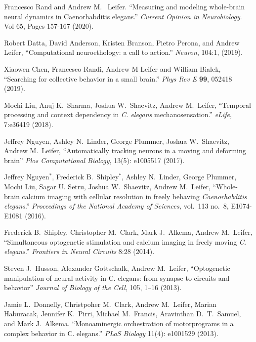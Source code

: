 \documentclass[11pt]{article}
\makeatletter
\newlength{\bibhang}
\newlength{\bibsep}
\newcounter{Lcount}
 {\@listi \global\bibsep\itemsep \global\advance\bibsep by\parsep}
\newenvironment{bibsection}%
        {\begin{list}{\arabic{Lcount}.}{%
       \usecounter{Lcount}%
       \setlength\labelwidth{-0.5em}%
       \setlength{\leftmargin}{\bibhang}%
       \setlength{\itemindent}{-\leftmargin}%
       \setlength{\itemsep}{\bibsep}%
       \setlength{\parsep}{\z@}%
        \setlength{\partopsep}{0pt}%
        \setlength{\topsep}{0pt}}}
        {\end{list}\vspace{-.6\baselineskip}}
\makeatother
\begin{document}
\begin{bibsection}
\item Francesco Rand and Andrew M.~ Leifer. ``Measuring and modeling whole-brain neural dynamics in Caenorhabditis elegans.'' \emph{Current Opinion in Neurobiology}. Vol 65, Pages 157-167 (2020).

\item Robert Datta, David Anderson, Kristen Branson, Pietro Perona, and Andrew Leifer, ``Computational neuroethology: a call to action.'' \emph{Neuron}, 104:1, (2019).

\item Xiaowen Chen, Francesco Randi, Andrew M Leifer and William Bialek, ``Searching for collective behavior in a small brain.'' \emph{Phys Rev E} \textbf{99}, 052418 (2019).

\item Mochi Liu, Anuj K.~Sharma, Joshua W.~Shaevitz, Andrew M.~Leifer, ``Temporal processing and context dependency in \textit{C. elegans} mechanosensation.'' \emph{eLife}, 7:e36419 (2018).   

\item Jeffrey Nguyen,  Ashley N.~Linder, George Plummer, Joshua
W.~Shaevitz, Andrew M.~Leifer, ``Automatically tracking neurons in a moving and deforming brain'' \emph{Plos Computational Biology}, 13(5): e1005517 (2017).
	
\item Jeffrey Nguyen$^{*}$, Frederick B.~Shipley$^{*}$, Ashley N.~Linder, George Plummer, Mochi Liu, Sagar U. Setru, Joshua
W.~Shaevitz, Andrew M.~Leifer, ``Whole-brain calcium imaging with cellular resolution in freely behaving \textit{Caenorhabditis elegans}.'' \emph{Proceedings of the National Academy of Sciences,}  vol.~113 no.~8, E1074-E1081 (2016). 

\item Frederick B.~Shipley, Christopher M.~Clark,  Mark J.~Alkema, Andrew M.~Leifer, ``Simultaneous optogenetic stimulation and calcium imaging in freely moving \textit{C. elegans}.'' \emph{Frontiers in Neural Circuits} 8:28 (2014).
	
\item Steven J.~Husson, Alexander Gottschalk, Andrew M.~Leifer, ``Optogenetic manipulation of neural activity in C. elegans: from synapse to circuits and behavior'' \emph{Journal of Biology of the Cell}, 105, 1--16 (2013).  

\item Jamie L.~Donnelly, Christpoher M.~Clark, Andrew M.~Leifer, Marian Haburacak, Jennifer K.~Pirri, Michael M.~Francis, Aravinthan D.~T.~Samuel, and Mark J.~Alkema. ``Monoaminergic orchestration of motorprograms in a complex behavior in C. elegans.'' \emph{PLoS Biology}  11(4): e1001529 (2013).	


\end{bibsection}
\end{document}
